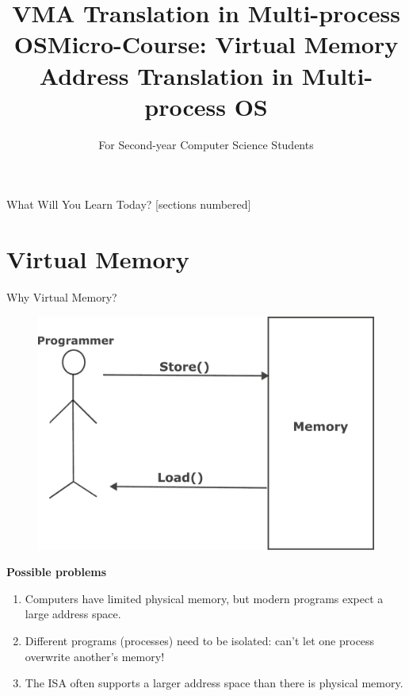\documentclass[11pt, table, aspectratio=169]{beamer}
\begin{document}
	
	\setcounter{framenumber}{0}
	\setcounter{section}{0}
	
	\title{VMA Translation in Multi-process OS}
	
	\maketitle
	
	
	\begin{frame}{What Will You Learn Today?}
		[sections numbered]
		\tableofcontents[hideallsubsections]
	\end{frame}
	\title{Micro-Course: Virtual Memory Address Translation in Multi-process OS}
	\author{For Second-year Computer Science Students}
	\date{}
	
	\section{\textbf{Virtual Memory}}

\begin{frame}{Why Virtual Memory?}
	\begin{figure}
		\centering
		\includegraphics[width=0.5 \linewidth ]{pic/memory2.pdf}
	\end{figure}
	\vspace{-0.45cm}
	\textbf{Possible problems}
	\begin{enumerate}
		\item Computers have limited physical memory, but modern programs expect a large address space.
		\item Different programs (processes) need to be isolated: can't let one process overwrite another's memory!
		\item The ISA often supports a larger address space than there is physical memory.
	\end{enumerate}
\end{frame}
\end{document}
